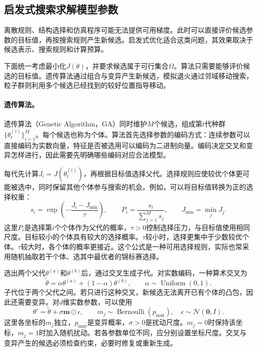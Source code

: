 \subsection{启发式搜索求解模型参数}
离散规则、结构选择和仿真程序可能无法提供可用梯度。此时可以直接评价候选参数的目标值，再按搜索规则产生新候选。启发式优化适合这类问题，其效果取决于候选表示、搜索规则和计算预算。

下面统一考虑最小化$J(\theta)$，并要求候选属于可行集合$\Omega$。算法只需要能够评价候选的目标值。遗传算法通过组合与变异产生新候选，模拟退火通过邻域移动搜索，粒子群则利用多个候选已经找到的较好位置指导移动。

\paragraph{遗传算法。}
遗传算法（Genetic Algorithm，GA）同时维护$M$个候选，组成第$t$代种群$\{\theta_t^{(i)}\}_{i=1}^M$。每个候选也称为个体。算法首先选择参数的编码方式：连续参数可以直接编码为实数向量，特征是否被选用可以编码为二进制向量。编码决定交叉和变异怎样进行，因此需要先明确哪些编码对应合法模型。

每代先计算$J_i=J(\theta_t^{(i)})$，再根据目标值选择父代。选择规则应使较优个体更可能被选中，同时保留其他个体参与搜索的机会。例如，可以将目标值转换为正的选择权重：
\begin{equation}
 s_i=\exp\left(-\frac{J_i-J_{\min}}{\tau}\right),\qquad
 P_i=\frac{s_i}{\sum_{j=1}^M s_j},\qquad J_{\min}=\min_j J_j.
 \label{eq:solving-ga-selection}
\end{equation}
这里$P_i$是选择第$i$个个体作为父代的概率，$\tau>0$控制选择压力，与目标值使用相同尺度。目标较小的个体具有较大的选择概率。$\tau$较小时，选择更集中于少数较优个体。$\tau$较大时，各个体的概率更接近。这个公式是一种可用选择规则，实际也常采用随机抽取若干个体、选其中最优者的锦标赛选择。

选出两个父代$\theta^{(a)}$和$\theta^{(b)}$后，通过交叉生成子代。对实数编码，一种算术交叉为
\begin{equation}
 \widetilde\theta=\alpha\theta^{(a)}+(1-\alpha)\theta^{(b)},\qquad
 \alpha\sim\operatorname{Uniform}(0,1).
\end{equation}
子代位于两个父代之间。若只进行这种交叉，新候选无法离开已有个体的凸包，因此还需要变异。对$d$维实数参数，可以使用
\begin{equation}
 \theta'=\widetilde\theta+\sigma\bm m\odot\epsilon,\qquad
 m_j\sim\operatorname{Bernoulli}(p_{\mathrm{mut}}),\quad
 \epsilon\sim\mathcal N(\bm0,I).
 \label{eq:solving-ga-mutation}
\end{equation}
这里各坐标的$m_j$独立，$p_{\mathrm{mut}}$是变异概率，$\sigma>0$是扰动尺度。$m_j=0$时保持该坐标，$m_j=1$时加入随机扰动。若各参数单位不同，应分别设置坐标尺度。交叉与变异产生的候选必须检查约束，必要时修复或重新生成。

